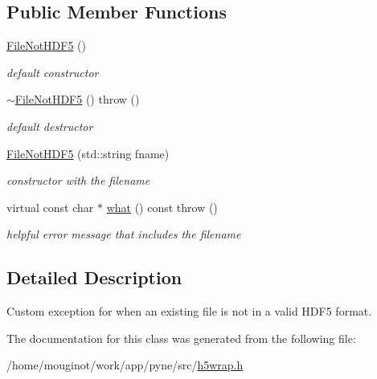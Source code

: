 \subsection*{Public Member Functions}
\begin{DoxyCompactItemize}
\item 
\mbox{\label{classh5wrap_1_1_file_not_h_d_f5_a3fa40cb39abaa241e80ee97a13e69815}} 
\hyperlink{classh5wrap_1_1_file_not_h_d_f5_a3fa40cb39abaa241e80ee97a13e69815}{File\+Not\+H\+D\+F5} ()
\begin{DoxyCompactList}\small\item\em default constructor \end{DoxyCompactList}\item 
\mbox{\label{classh5wrap_1_1_file_not_h_d_f5_a55276b2bc97da82f25a0718327b00742}} 
\hyperlink{classh5wrap_1_1_file_not_h_d_f5_a55276b2bc97da82f25a0718327b00742}{$\sim$\+File\+Not\+H\+D\+F5} ()  throw ()
\begin{DoxyCompactList}\small\item\em default destructor \end{DoxyCompactList}\item 
\mbox{\label{classh5wrap_1_1_file_not_h_d_f5_ac6f9e6588f3a55f26fe6cd13ab75425b}} 
\hyperlink{classh5wrap_1_1_file_not_h_d_f5_ac6f9e6588f3a55f26fe6cd13ab75425b}{File\+Not\+H\+D\+F5} (std\+::string fname)
\begin{DoxyCompactList}\small\item\em constructor with the filename \end{DoxyCompactList}\item 
\mbox{\label{classh5wrap_1_1_file_not_h_d_f5_a14843e8c0d01e17f5335ca53f1198aef}} 
virtual const char $\ast$ \hyperlink{classh5wrap_1_1_file_not_h_d_f5_a14843e8c0d01e17f5335ca53f1198aef}{what} () const  throw ()
\begin{DoxyCompactList}\small\item\em helpful error message that includes the filename \end{DoxyCompactList}\end{DoxyCompactItemize}


\subsection{Detailed Description}
Custom exception for when an existing file is not in a valid H\+D\+F5 format. 

The documentation for this class was generated from the following file\+:\begin{DoxyCompactItemize}
\item 
/home/mouginot/work/app/pyne/src/\hyperlink{h5wrap_8h}{h5wrap.\+h}\end{DoxyCompactItemize}
